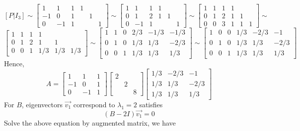 \documentclass{article}
\begin{document}
\[[P|I_3]\sim 
\left[\begin{array}{rrrrrr}
1 & 1 & 1 & 1 \\
-1 & 0 & 1 &  & 1\\
0 & -1 & 1 &  &  & 1
\end{array}\right]\sim
\left[\begin{array}{rrrrrr}
1 & 1 & 1 & 1 \\
0 & 1 & 2 & 1 & 1\\
0 & -1 & 1 &  &  & 1
\end{array}\right]\sim
\left[\begin{array}{rrrrrr}
1 & 1 & 1 & 1 \\
0 & 1 & 2 & 1 & 1\\
0 & 0 & 3 & 1 & 1 & 1
\end{array}\right]\sim
\]\[
\left[\begin{array}{rrrrrr}
1 & 1 & 1 & 1 \\
0 & 1 & 2 & 1 & 1\\
0 & 0 & 1 & 1/3 & 1/3 & 1/3
\end{array}\right]\sim
\left[\begin{array}{rrrrrr}
1 & 1 & 0 & 2/3 & -1/3 & -1/3 \\
0 & 1 & 0 & 1/3 & 1/3 & -2/3\\
0 & 0 & 1 & 1/3 & 1/3 & 1/3
\end{array}\right]\sim
\left[\begin{array}{rrrrrr}
1 & 0 & 0 & 1/3 & -2/3 & -1 \\
0 & 1 & 0 & 1/3 & 1/3 & -2/3\\
0 & 0 & 1 & 1/3 & 1/3 & 1/3
\end{array}\right]
\]
Hence,
\[A=\left[\begin{array}{rrr}
1 & 1 & 1 \\
-1 & 0 &1 \\ 0 & -1 & 1 \end{array}\right]\left[\begin{array}{rrr}
2\\ & 2 \\ && 8 
\end{array}\right]\left[\begin{array}{rrr}
 1/3 & -2/3 & -1 \\
 1/3 & 1/3 & -2/3\\
 1/3 & 1/3 & 1/3
\end{array}\right]\]
For $B$,\newline
eigenvectors $\Vec{v_1}$ correspond to $\lambda_1=2$ satisfies
\[(B-2I)\Vec{v_1}=0\]
Solve the above equation by augmented matrix, we have
\end{document}

